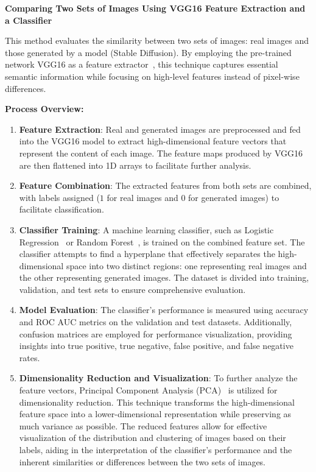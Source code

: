 \documentclass[12pt,DIV14,BCOR12mm,a4paper,footinclude=false,headinclude,parskip=half-,twoside,openright,cleardoublepage=empty,toc=index,bibliography=totoc,listof=totoc]{scrreprt}
\numberwithin{equation}{chapter}
\begin{document}
\newpage

\textbf{Comparing Two Sets of Images Using VGG16 Feature Extraction and a Classifier}

This method evaluates the similarity between two sets of images: real images and those generated by a model (Stable Diffusion). By employing the pre-trained network VGG16 as a feature extractor~\cite{florkowski2021anomaly}, this technique captures essential semantic information while focusing on high-level features instead of pixel-wise differences.

\textbf{Process Overview:}
\begin{enumerate}
    \item \textbf{Feature Extraction}: Real and generated images are preprocessed and fed into the VGG16 model to extract high-dimensional feature vectors that represent the content of each image. The feature maps produced by VGG16 are then flattened into 1D arrays to facilitate further analysis.

    \item \textbf{Feature Combination}: The extracted features from both sets are combined, with labels assigned ($1$ for real images and $0$ for generated images) to facilitate classification.

    \item \textbf{Classifier Training}: A machine learning classifier, such as Logistic Regression~\cite{lavalley2008logistic} or Random Forest~\cite{rigatti2017random}, is trained on the combined feature set. The classifier attempts to find a hyperplane that effectively separates the high-dimensional space into two distinct regions: one representing real images and the other representing generated images. The dataset is divided into training, validation, and test sets to ensure comprehensive evaluation.

    \item \textbf{Model Evaluation}: The classifier's performance is measured using accuracy and ROC AUC metrics on the validation and test datasets. Additionally, confusion matrices are employed for performance visualization, providing insights into true positive, true negative, false positive, and false negative rates.

    \item \textbf{Dimensionality Reduction and Visualization}: To further analyze the feature vectors, Principal Component Analysis (PCA)~\cite{abdi2010principal} is utilized for dimensionality reduction. This technique transforms the high-dimensional feature space into a lower-dimensional representation while preserving as much variance as possible. The reduced features allow for effective visualization of the distribution and clustering of images based on their labels, aiding in the interpretation of the classifier's performance and the inherent similarities or differences between the two sets of images.
\end{enumerate}
\end{document}
